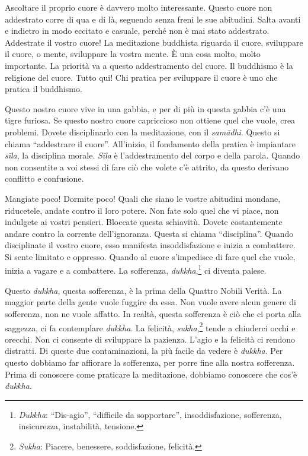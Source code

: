 Ascoltare il proprio cuore è davvero molto interessante. Questo cuore
non addestrato corre di qua e di là, seguendo senza freni le sue
abitudini. Salta avanti e indietro in modo eccitato e casuale, perché
non è mai stato addestrato. Addestrate il vostro cuore! La meditazione
buddhista riguarda il cuore, sviluppare il cuore, o mente, sviluppare la
vostra mente. È una cosa molto, molto importante. La priorità va a
questo addestramento del cuore. Il buddhismo è la religione del cuore.
Tutto qui! Chi pratica per sviluppare il cuore è uno che pratica il
buddhismo.

Questo nostro cuore vive in una gabbia, e per di più in questa gabbia
c'è una tigre furiosa. Se questo nostro cuore capriccioso non ottiene
quel che vuole, crea problemi. Dovete disciplinarlo con la meditazione,
con il \emph{samādhi}. Questo si chiama ``addestrare il cuore''.
All'inizio, il fondamento della pratica è impiantare \emph{sīla}, la
disciplina morale. \emph{Sīla} è l'addestramento del corpo e della
parola. Quando non consentite a voi stessi di fare ciò che volete c'è
attrito, da questo derivano conflitto e confusione.

Mangiate poco! Dormite poco! Quali che siano le vostre abitudini
mondane, riducetele, andate contro il loro potere. Non fate solo quel
che vi piace, non indulgete ai vostri pensieri. Bloccate questa
schiavitù. Dovete costantemente andare contro la corrente
dell'ignoranza. Questa si chiama ``disciplina''. Quando disciplinate il
vostro cuore, esso manifesta insoddisfazione e inizia a combattere. Si
sente limitato e oppresso. Quando al cuore s'impedisce di fare quel che
vuole, inizia a vagare e a combattere. La sofferenza,
\emph{dukkha},\footnote{\emph{Dukkha}: ``Dis-agio'', ``difficile da
  sopportare'', insoddisfazione, sofferenza, insicurezza, instabilità,
  tensione.} ci diventa palese.

Questo \emph{dukkha}, questa sofferenza, è la prima della Quattro Nobili
Verità. La maggior parte della gente vuole fuggire da essa. Non vuole
avere alcun genere di sofferenza, non ne vuole affatto. In realtà,
questa sofferenza è ciò che ci porta alla saggezza, ci fa contemplare
\emph{dukkha}. La felicità, \emph{sukha},\footnote{\emph{Sukha}:
  Piacere, benessere, soddisfazione, felicità.} tende a chiuderci occhi
e orecchi. Non ci consente di sviluppare la pazienza. L'agio e la
felicità ci rendono distratti. Di queste due contaminazioni, la più
facile da vedere è \emph{dukkha}. Per questo dobbiamo far affiorare la
sofferenza, per porre fine alla nostra sofferenza. Prima di conoscere
come praticare la meditazione, dobbiamo conoscere che cos'è
\emph{dukkha}.

